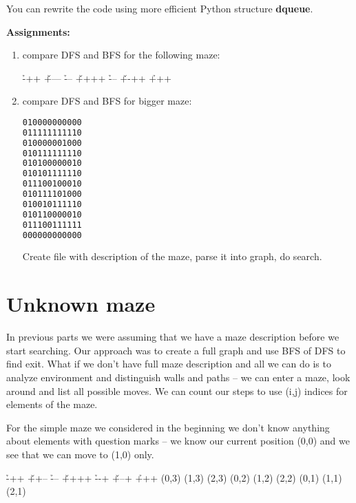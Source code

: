 You can rewrite the code using more efficient Python structure \textbf{dqueue}.

\begin{tcolorbox}
\textbf{Assignments:}
\begin{enumerate}
\item compare DFS and BFS for the following maze:
\begin{labyrinth}{3}{4}
        \h -++
\v +--- \h ---
\v ++++ \h ---
\v +-++ \h +++
\end{labyrinth}
\item compare DFS and BFS for bigger maze:

\begin{lstlisting}[language=bash]
010000000000
011111111110
010000001000
010111111110
010100000010
010101111110
011100100010
010111101000
010010111110
010110000010
011100111111
000000000000
\end{lstlisting}

Create file with description of the maze, parse it into graph,
do search.
\end{enumerate}
\end{tcolorbox}


\section{Unknown maze}

In previous parts we were assuming that we have a maze
description before we start searching. Our approach
was to create a full graph and use BFS of DFS to
find exit. What if we don't have full maze description and
all we can do is to analyze environment and distinguish
walls and paths -- we can enter a maze, look around
and list all possible moves. We can count our steps
to use (i,j) indices for elements of the maze.

For the simple maze we considered
in the beginning we don't know anything about elements
with question marks -- we know our current position (0,0)
and we see that we can move to (1,0) only.

\begin{labyrinth}{3}{4}
        \h -++
\v ++-- \h ---
\v ++++ \h --+
\v +--+ \h +++
\putsymbol(0,3){}
\putsymbol(1,3){}
\putsymbol(2,3){}
\putsymbol(0,2){}
\putsymbol(1,2){}
\putsymbol(2,2){}
\putsymbol(0,1){}
\putsymbol(1,1){}
\putsymbol(2,1){}
\end{labyrinth}

